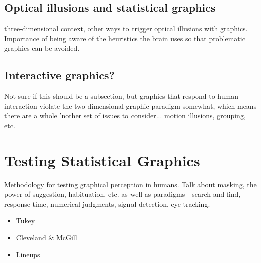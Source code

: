 \documentclass[11pt]{isuthesis}
\begin{document}
\subsection{Optical illusions and statistical graphics}
three-dimensional context, other ways to trigger optical illusions with graphics. Importance of being aware of the heuristics the brain uses so that problematic graphics can be avoided. 

\subsection{Interactive graphics?} 
Not sure if this should be a subsection, but graphics that respond to human interaction violate the two-dimensional graphic paradigm somewhat, which means there are a whole 'nother set of issues to consider... motion illusions, grouping, etc.

\section{Testing Statistical Graphics}
Methodology for testing graphical perception in humans. Talk about masking, the power of suggestion, habituation, etc. as well as paradigms - search and find, response time, numerical judgments, signal detection, eye tracking. 
\begin{itemize}
  \item Tukey
  \item Cleveland \& McGill
  \item Lineups
\end{itemize}
\end{document}
